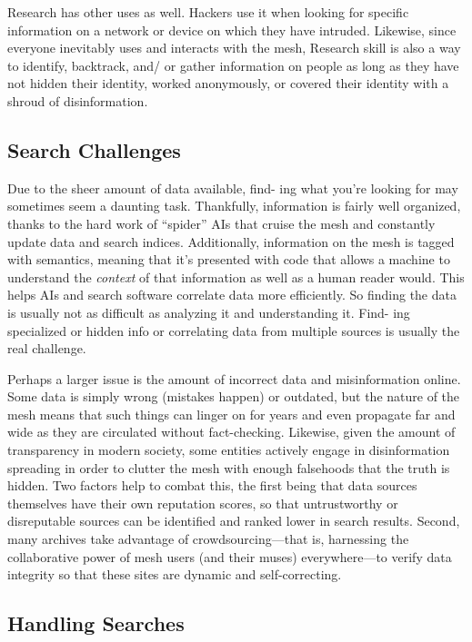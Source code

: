 Research has other uses as well. Hackers use it 
when looking for specific information on a network or 
device on which they have intruded. Likewise, since 
everyone inevitably uses and interacts with the mesh, 
Research skill is also a way to identify, backtrack, and/
or gather information on people as long as they have 
not hidden their identity, worked anonymously, or 
covered their identity with a shroud of disinformation.

\subsection{Search Challenges}

Due to the sheer amount of data available, find-
ing what you're looking for may sometimes seem a 
daunting task. Thankfully, information is fairly well 
organized, thanks to the hard work of ``spider'' AIs 
that cruise the mesh and constantly update data and 
search indices. Additionally, information on the mesh 
is tagged with semantics, meaning that it's presented 
with code that allows a machine to understand the 
\textit{context }of that information as well as a human reader 
would. This helps AIs and search software correlate 
data more efficiently. So finding the data is usually not 
as difficult as analyzing it and understanding it. Find-
ing specialized or hidden info or correlating data from 
multiple sources is usually the real challenge.

Perhaps a larger issue is the amount of incorrect 
data and misinformation online. Some data is simply 
wrong (mistakes happen) or outdated, but the nature 
of the mesh means that such things can linger on for 
years and even propagate far and wide as they are 
circulated without fact-checking. Likewise, given 
the amount of transparency in modern society, some 
entities actively engage in disinformation spreading 
in order to clutter the mesh with enough falsehoods 
that the truth is hidden. Two factors help to combat 
this, the first being that data sources themselves have 
their own reputation scores, so that untrustworthy 
or disreputable sources can be identified and ranked 
lower in search results. Second, many archives take 
advantage of crowdsourcing—that is, harnessing the 
collaborative power of mesh users (and their muses) 
everywhere—to verify data integrity so that these sites 
are dynamic and self-correcting.

\subsection{Handling Searches}


